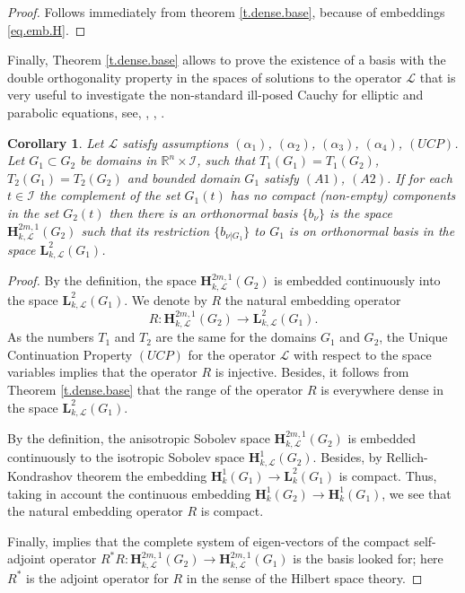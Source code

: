 \documentclass{amsart}
\newtheorem{cor}[thm]{Corollary}
\theoremstyle{definition}
\theoremstyle{remark}
\numberwithin{equation}{section}
\begin{document}
\begin{proof} Follows immediately from theorem \ref{t.dense.base}, 
because of embeddings \eqref{eq.emb.H}.
\end{proof}

Finally, Theorem \ref{t.dense.base} allows to prove the existence 
of a basis with the double orthogonality property in the spaces of solutions 
to the operator $\mathcal L$ that is very useful to investigate the non-standard 
ill-posed Cauchy for elliptic and parabolic equations, see, 
\cite[Ch. 12]{Tark36}, \cite{ShTaLMS}, \cite{VKShLame}.

\begin{cor} \label{c.bdo} 
Let ${\mathcal L}$ satisfy assumptions $(\alpha_1)$, $(\alpha_2)$, $(\alpha_3)$, 
$(\alpha_4)$, $(UCP)$. Let  $G_1 \subset G_2 $ be domains in ${\mathbb R}^{n}
\times \mathcal{I}$, such that $T_1 (G_1)= T_1 (G_2)$, $T_2 (G_1) = T_2 (G_2)$ and 
 bounded domain $G_1$ satisfy $(A1)$, $(A2)$. If for each $t \in \mathcal{I}$ the complement of the set 
$G_1 (t) $ has no compact (non-empty) components in the set $G_2 (t)$ then there is an 
orthonormal basis  $\{ b_\nu\}$ is the space $\mathbf{H}^{2m,1}_{k,\mathcal L} (G_2)$ such 
that its restriction $\{ b_{\nu|G_1}\}$ to $G_1$ is on orthonormal basis in the space 
$\mathbf{L}^{2}_{k,\mathcal L} (G_1)$. 
\end{cor} 

\begin{proof} By the definition, the space $\mathbf{H}^{2m,1} _{k,\mathcal L} (G_2)$  is 
embedded continuously into the space $\mathbf{L}^2 _{k,\mathcal L} (G_1)$.  We denote by $R$ 
the natural embedding operator  
$$
R: \mathbf{H}^{2m,1} _{k,\mathcal L}(G_2)\to 
\mathbf{L}^2 _{k,\mathcal L}(G_1).
$$ 
As the numbers $T_1$ and $T_2$ are the same for the domains $G_1$ and $G_2$, 
the Unique Continuation Property $(UCP)$ for the operator  $\mathcal L$ 
with respect to the space variables implies that the operator $R$ is injective.
Besides, it follows from Theorem \ref{t.dense.base} that the range of the operator 
$R$ is everywhere dense in the space ${\mathbf L}^2 _{k,\mathcal L}(G_1)$. 

By the definition, the anisotropic Sobolev space   
$\mathbf{H}^{2m,1} _{k,\mathcal L}(G_2)$ is embedded continuously 
to the isotropic Sobolev space  $\mathbf{H}^{1} _{k,\mathcal L}(G_2)$. Besides,  
by Rellich-Kondrashov theorem the embedding  
$\mathbf{H}^{1} _{k}(G_1) \to {\mathbf L }^2_k (G_1)$ is compact. 
Thus, taking in account the continuous embedding 
$\mathbf{H}^{1} _{k}(G_2) \to {\mathbf H }^1_k (G_1)$, we see that 
the natural embedding operator $R$  is compact. 

Finally,   \cite[example 1.9]{ShTaLMS} implies that the complete system of eigen-vectors 
of the  compact self-adjoint operator
 $R^* R: 
\mathbf{H}^{2m,1} _{k,\mathcal L}(G_2) \to \mathbf{H}^{2m,1} _{k,\mathcal L}(G_1)$ 
is the basis looked for; here  $R^*$ is the adjoint operator for $R$ 
in the sense of the Hilbert space theory.
\end{proof}
\end{document}
